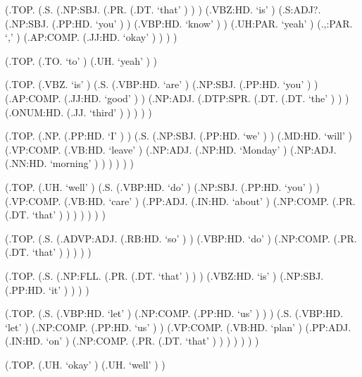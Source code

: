 \documentclass[10pt]{article}
\begin{document}
\begin{parsetree}  (.TOP. (.S. (.NP:SBJ. (.PR. (.DT. `that' ) ) ) (.VBZ:HD. `is' ) (.S:ADJ?. (.NP:SBJ. (.PP:HD. `you' ) ) (.VBP:HD. `know' ) ) (.UH:PAR. `yeah' ) (.,:PAR. `,' ) (.AP:COMP. (.JJ:HD. `okay' ) ) ) ) \end{parsetree}

\begin{parsetree}  (.TOP. (.TO. `to' ) (.UH. `yeah' ) ) \end{parsetree}

\begin{parsetree}  (.TOP. (.VBZ. `is' ) (.S. (.VBP:HD. `are' ) (.NP:SBJ. (.PP:HD. `you' ) ) (.AP:COMP. (.JJ:HD. `good' ) ) (.NP:ADJ. (.DTP:SPR. (.DT. (.DT. `the' ) ) ) (.ONUM:HD. (.JJ. `third' ) ) ) ) ) \end{parsetree}

\begin{parsetree}  (.TOP. (.NP. (.PP:HD. `I' ) ) (.S. (.NP:SBJ. (.PP:HD. `we' ) ) (.MD:HD. `will' ) (.VP:COMP. (.VB:HD. `leave' ) (.NP:ADJ. (.NP:HD. `Monday' ) (.NP:ADJ. (.NN:HD. `morning' ) ) ) ) ) ) \end{parsetree}

\begin{parsetree}  (.TOP. (.UH. `well' ) (.S. (.VBP:HD. `do' ) (.NP:SBJ. (.PP:HD. `you' ) ) (.VP:COMP. (.VB:HD. `care' ) (.PP:ADJ. (.IN:HD. `about' ) (.NP:COMP. (.PR. (.DT. `that' ) ) ) ) ) ) ) \end{parsetree}

\begin{parsetree}  (.TOP. (.S. (.ADVP:ADJ. (.RB:HD. `so' ) ) (.VBP:HD. `do' ) (.NP:COMP. (.PR. (.DT. `that' ) ) ) ) ) \end{parsetree}

\begin{parsetree}  (.TOP. (.S. (.NP:FLL. (.PR. (.DT. `that' ) ) ) (.VBZ:HD. `is' ) (.NP:SBJ. (.PP:HD. `it' ) ) ) ) \end{parsetree}

\begin{parsetree}  (.TOP. (.S. (.VBP:HD. `let' ) (.NP:COMP. (.PP:HD. `us' ) ) ) (.S. (.VBP:HD. `let' ) (.NP:COMP. (.PP:HD. `us' ) ) (.VP:COMP. (.VB:HD. `plan' ) (.PP:ADJ. (.IN:HD. `on' ) (.NP:COMP. (.PR. (.DT. `that' ) ) ) ) ) ) ) \end{parsetree}

\begin{parsetree}  (.TOP. (.UH. `okay' ) (.UH. `well' ) ) \end{parsetree}
\end{document}
